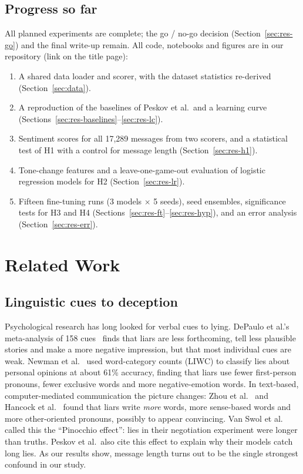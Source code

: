 \documentclass[conference]{IEEEtran}
\begin{document}
\subsection{Progress so far}
All planned experiments are complete; the go / no-go decision (Section~\ref{sec:res-go}) and the final write-up remain. All code, notebooks and figures are in our repository (link on the title page):
\begin{enumerate}
\item A shared data loader and scorer, with the dataset statistics re-derived (Section~\ref{sec:data}).
\item A reproduction of the baselines of Peskov et al.\ and a learning curve (Sections~\ref{sec:res-baselines}--\ref{sec:res-lc}).
\item Sentiment scores for all 17,289 messages from two scorers, and a statistical test of H1 with a control for message length (Section~\ref{sec:res-h1}).
\item Tone-change features and a leave-one-game-out evaluation of logistic regression models for H2 (Section~\ref{sec:res-lr}).
\item Fifteen fine-tuning runs (3 models $\times$ 5 seeds), seed ensembles, significance tests for H3 and H4 (Sections~\ref{sec:res-ft}--\ref{sec:res-hyp}), and an error analysis (Section~\ref{sec:res-err}).
\end{enumerate}

\section{Related Work}
\label{sec:related}

\subsection{Linguistic cues to deception}
Psychological research has long looked for verbal cues to lying. DePaulo et al.'s meta-analysis of 158 cues~\cite{depaulo2003cues} finds that liars are less forthcoming, tell less plausible stories and make a more negative impression, but that most individual cues are weak. Newman et al.~\cite{newman2003lying} used word-category counts (LIWC) to classify lies about personal opinions at about 61\% accuracy, finding that liars use fewer first-person pronouns, fewer exclusive words and more negative-emotion words. In text-based, computer-mediated communication the picture changes: Zhou et al.~\cite{zhou2004automating} and Hancock et al.~\cite{hancock2008lying} found that liars write \emph{more} words, more sense-based words and more other-oriented pronouns, possibly to appear convincing. Van Swol et al.~\cite{vanswol2012pinocchio} called this the ``Pinocchio effect'': lies in their negotiation experiment were longer than truths. Peskov et al.\ also cite this effect to explain why their models catch long lies. As our results show, message length turns out to be the single strongest confound in our study.
\end{document}
